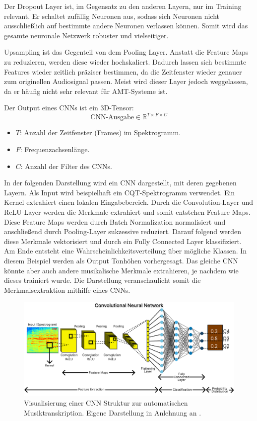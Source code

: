 Der Dropout Layer ist, im Gegensatz zu den anderen Layern, nur im Training relevant.
Er schaltet zufällig Neuronen aus,
sodass sich Neuronen nicht ausschließlich auf bestimmte andere Neuronen verlassen können.
Somit wird das gesamte neuronale Netzwerk robuster und vielseitiger.

Upsampling ist das Gegenteil von dem Pooling Layer.
Anstatt die Feature Maps zu reduzieren, werden diese wieder hochskaliert.
Dadurch lassen sich bestimmte Features wieder zeitlich präziser bestimmen,
da die Zeitfenster wieder genauer zum originellen Audiosignal passen.
Meist wird dieser Layer jedoch weggelassen, da er häufig nicht sehr relevant für AMT-Systeme ist.

Der Output eines CNNs ist ein 3D-Tensor:
\[
\text{CNN-Ausgabe} \in \mathbb{R}^{T \times F \times C}
\]
\begin{itemize}
\item $T$: Anzahl der Zeitfenster (Frames) im Spektrogramm.
\item $F$: Frequenzachsenlänge.
\item $C$: Anzahl der Filter des CNNs.
\end{itemize}

In der folgenden Darstellung wird ein CNN dargestellt, mit deren gegebenen Layern.
Als Input wird beispielhaft ein CQT-Spektrogramm verwendet.
Ein Kernel extrahiert einen lokalen Eingabebereich.
Durch die Convolution-Layer und ReLU-Layer werden die Merkmale extrahiert und somit entstehen Feature Maps.
Diese Feature Maps werden durch Batch Normalization normalisiert und anschließend durch Pooling-Layer sukzessive reduziert.
Darauf folgend werden diese Merkmale vektorisiert und durch ein Fully Connected Layer klassifiziert.
Am Ende entsteht eine Wahrscheinlichkeitsverteilung über mögliche Klassen.
In diesem Beispiel werden als Output Tonhöhen vorhergesagt.
Das gleiche CNN könnte aber auch andere musikalische Merkmale extrahieren, je nachdem wie dieses trainiert wurde.
Die Darstellung veranschaulicht somit die Merkmalsextraktion mithilfe eines CNNs.
\begin{figure}[H]
    \centering
    \includegraphics[width=1\textwidth]{Graphics/CNN}
    \caption[CNN Struktur]{Visualisierung einer CNN Struktur zur automatischen Musiktranskription. Eigene Darstellung in Anlehnung an  \cite{shahriar2020cnn}.}
    \label{fig:cnn-amt}
\end{figure}

